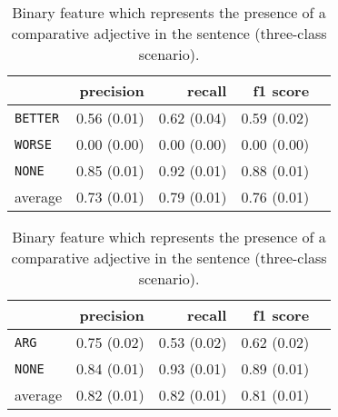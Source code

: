 	\begin{table}[h] 
		\centering 
		\caption{Binary feature which represents the presence of a comparative adjective in the sentence (three-class scenario).} 
		\label{ }
		\begin{tabular}{@{}lrrrr@{}}
			\toprule
			        & precision                & recall                   & f1 score                 \\ \midrule 
			\texttt{BETTER}  & 0.56 \scriptsize{(0.01)} & 0.62 \scriptsize{(0.04)} & 0.59 \scriptsize{(0.02)} \\ 
			\texttt{WORSE}   & 0.00 \scriptsize{(0.00)} & 0.00 \scriptsize{(0.00)} & 0.00 \scriptsize{(0.00)} \\ 
			\texttt{NONE}    & 0.85 \scriptsize{(0.01)} & 0.92 \scriptsize{(0.01)} & 0.88 \scriptsize{(0.01)} \\ 
			average & 0.73 \scriptsize{(0.01)} & 0.79 \scriptsize{(0.01)} & 0.76 \scriptsize{(0.01)} \\ 
			\bottomrule
		\end{tabular}
	\end{table}
	
		\begin{table}[h] 
		\centering 
		\caption{ Binary feature which represents the presence of a comparative adjective in the sentence (three-class scenario). } 
		\label{  }
		\begin{tabular}{@{}lrrrr@{}}
			\toprule
			        & precision                & recall                   & f1 score                 \\ \midrule 
			\texttt{ARG}     & 0.75 \scriptsize{(0.02)} & 0.53 \scriptsize{(0.02)} & 0.62 \scriptsize{(0.02)} \\ 
			\texttt{NONE}    & 0.84 \scriptsize{(0.01)} & 0.93 \scriptsize{(0.01)} & 0.89 \scriptsize{(0.01)} \\ 
			average & 0.82 \scriptsize{(0.01)} & 0.82 \scriptsize{(0.01)} & 0.81 \scriptsize{(0.01)} \\ 
			\bottomrule
		\end{tabular}
	\end{table}
	
	
	
